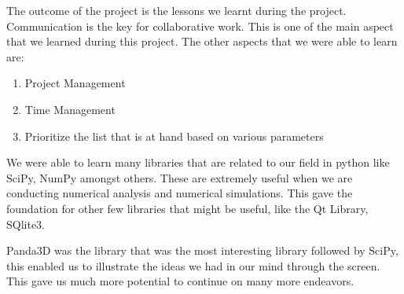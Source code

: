 The outcome of the project is the lessons we learnt during the project. Communication is the key for collaborative work. This is one of the main aspect that we learned during this project. The other aspects that we were able to learn are:
\begin{enumerate}
\item Project Management
\item Time Management
\item Prioritize the list that is at hand based on various parameters
\end{enumerate}
We were able to learn many libraries that are related to our field in python like SciPy, NumPy amongst others. These are extremely useful when we are conducting numerical analysis and numerical simulations. This gave the foundation for other few libraries that might be useful, like the Qt Library, SQlite3.  

Panda3D was the library that was the most interesting library followed by SciPy, this enabled us to illustrate the ideas we had in our mind through the screen. This gave us much more potential to continue on many more endeavors.